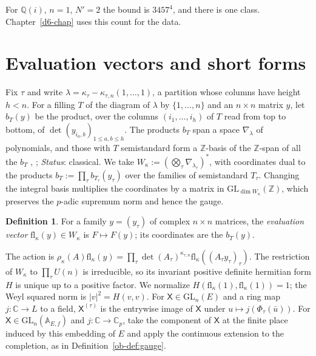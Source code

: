 \documentclass[reqno]{amsart}
\newcounter{chap}
\theoremstyle{definition}
\newtheorem{definition}[problem]{Definition}
\theoremstyle{plain}
\theoremstyle{remark}
\newcommand{\Z}{\mathbb{Z}}
\newcommand{\Q}{\mathbb{Q}}
\newcommand{\C}{\mathbb{C}}
\newcommand{\fl}{\mathrm{fl}}
\begin{document}
For \(\Q(i)\), \(n=1\), \(N'=2\) the bound is \(3457^4\), and there is one class.  Chapter~\ref{d6-chap} uses this count for the data.

\section{Evaluation vectors and short forms}\label{sec:eval}

Fix \(\tau\) and write \(\lambda=\kappa_\tau-\kappa_{\tau,n}(1,\dots,1)\), a partition whose columns have height \(h<n\).  For a filling \(T\) of the diagram of \(\lambda\) by \(\{1,\dots,n\}\) and an \(n\times n\) matrix \(y\), let \(b_T(y)\) be the product, over the columns \((i_1,\dots,i_h)\) of \(T\) read from top to bottom, of \(\det(y_{i_a,b})_{1\le a,b\le h}\).  The products \(b_T\) span a space \(\nabla_\lambda\) of polynomials, and those with \(T\) semistandard form a \(\Z\)-basis of the \(\Z\)-span of all the \(b_T\) \cite{DEP}, \cite{Fu}; \emph{Status}: classical.  We take \(W_\kappa:=(\bigotimes_\tau\nabla_{\lambda_\tau})^*\), with coordinates dual to the products \(b_T:=\prod_\tau b_{T_\tau}(y_\tau)\) over the families of semistandard \(T_\tau\).  Changing the integral basis multiplies the coordinates by a matrix in \(\mathrm{GL}_{\dim W_\kappa}(\Z)\), which preserves the \(p\)-adic supremum norm and hence the gauge.

\begin{definition}\label{def:minors}
For a family \(y=(y_\tau)\) of complex \(n\times n\) matrices, the \emph{evaluation vector} \(\fl_\kappa(y)\in W_\kappa\) is \(F\mapsto F(y)\); its coordinates are the \(b_T(y)\).
\end{definition}

The action is \(\rho_\kappa(A)\fl_\kappa(y)=\prod_\tau\det(A_\tau)^{\kappa_{\tau,n}}\fl_\kappa((A_\tau y_\tau)_\tau)\).  The restriction of \(W_\kappa\) to \(\prod_\tau U(n)\) is irreducible, so its invariant positive definite hermitian form \(H\) is unique up to a positive factor.  We normalize \(H(\fl_\kappa(1),\fl_\kappa(1))=1\); the Weyl squared norm is \(\lvert v\rvert^2=H(v,v)\).  For \(\mathsf X\in\mathrm{GL}_n(E)\) and a ring map \(j\colon\C\to L\) to a field, \(\mathsf X^{(\tau)}\) is the entrywise image of \(\mathsf X\) under \(u\mapsto j(\Phi_\tau(\bar u))\).  For \(\mathsf X\in\mathrm{GL}_n(\mathbb A_{E,f})\) and \(j\colon\C\to\C_p\), take the component of \(\mathsf X\) at the finite place induced by this embedding of \(E\) and apply the continuous extension to the completion, as in Definition~\ref{ob-def:gauge}.
\end{document}
